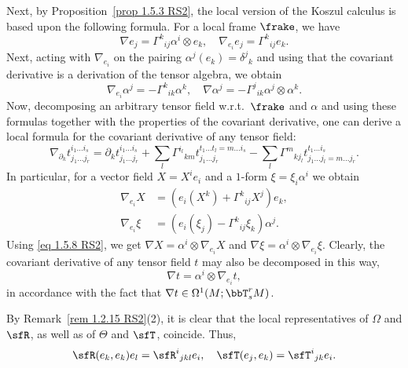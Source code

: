 Next, by Proposition~\ref{prop 1.5.3 RS2}, the local version of the Koszul calculus is based upon the following formula. For a local frame $\frake$, we have 
\[\nabla e_j=\varGamma^k{}_{ij}\alpha^i\otimes e_k, \quad \nabla_{e_i}e_j=\varGamma^k{}_{ij}e_k. \label{eq 2.1.45/46 RS2}\]
Next, acting with $\nabla_{e_i}$ on the pairing $\alpha^j(e_k)=\delta^j{}_k$ and using that the covariant derivative is a derivation of the tensor algebra, we obtain 
\[\nabla_{e_i}\alpha^j=-\varGamma^k{}_{ik}\alpha^k,\quad \nabla\alpha^j=-\varGamma^j{}_{ik}\alpha^j\otimes\alpha^k.\label{eq 2.1.47/48 RS2}\]
Now, decomposing an arbitrary tensor field w.r.t.\ $\frake$ and $\alpha$ and using these formulas together with the properties of the covariant derivative, one can derive a local formula for the covariant derivative of any tensor field:
\[\nabla_{\partial_k}t_{j_1\ldots j_r}^{i_1\ldots i_s}=\partial_kt_{j_1\ldots j_r}^{i_1\ldots i_s}+\sum_l\varGamma^{i_l}{}_{km}t_{j_1\ldots j_r}^{t_1\ldots t_l=m\ldots i_s}-
\sum_l\varGamma^{m}{}_{kj_l}t_{j_1\ldots j_l=m\ldots  j_r}^{t_1\ldots i_s}.
\]
In particular, for a vector field $X=X^i e_i$ and a $1$-form $\xi=\xi_i\alpha^i$ we obtain 
\begin{align}
    \nabla_{e_i}X&=(e_i(X^k)+\varGamma^k{}_{ij}X^j)e_k,\label{eq 2.1.49 RS2}\\
    \nabla_{e_i}\xi&=(e_i(\xi_j)-\varGamma^k{}_{ij}\xi_k)\alpha^j.\label{eq 2.1.50 RS2}
\end{align}
Using \eqref{eq 1.5.8 RS2}, we get $\nabla X=\alpha^i\otimes\nabla_{e_i}X$ and $\nabla\xi=\alpha^i\otimes\nabla_{e_i}\xi$. Clearly, the covariant derivative of any tensor field $t$ may also be decomposed in this way,
\[\nabla t=\alpha^i\otimes \nabla_{e_i} t,\]
in accordance with the fact that $\nabla t\in\Omega^1(M;\bbT^r_s M)$.

\begin{rem}\label{rem 2.1.28 RS2}
    By Remark~\ref{rem 1.2.15 RS2}(2), it is clear that the local representatives of $\Omega$ and $\sfR$, as well as of $\Theta$ and $\sfT$, coincide. Thus,
    \[\sfR(e_k,e_k)e_l=\sfR^i{}_{jkl}e_i,\quad \sfT(e_j,e_k)=\sfT^i{}_{jk}e_i.\]
\end{rem}

